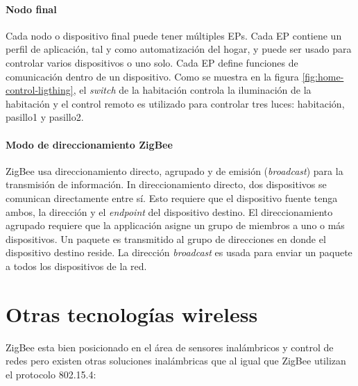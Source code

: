 \documentclass[10pt,journal,compsoc]{IEEEtran}
\begin{document}
\paragraph{Nodo final} Cada nodo o dispositivo final puede tener múltiples EPs. Cada EP contiene un perfil de aplicación, tal y como automatización del hogar, y puede ser usado para controlar varios dispositivos o uno solo. Cada EP define funciones de comunicación dentro de un dispositivo. Como se muestra en la figura \ref{fig:home-control-ligthing}, el \emph{switch} de la habitación controla la iluminación de la habitación y el control remoto es utilizado para controlar tres luces: habitación, pasillo1 y pasillo2.

\paragraph{Modo de direccionamiento ZigBee}
ZigBee usa direccionamiento directo, agrupado y de emisión (\emph{broadcast}) para la transmisión de información. In direccionamiento directo, dos dispositivos se comunican directamente entre sí. Esto requiere que el dispositivo fuente tenga ambos, la dirección y el \emph{endpoint} del dispositivo destino. El direccionamiento agrupado requiere que la applicación asigne un grupo de miembros a uno o más dispositivos. Un paquete es transmitido al grupo de direcciones en donde el dispositivo destino reside. La dirección \emph{broadcast} es usada para enviar un paquete a todos los dispositivos de la red. 


%
%

\section{Otras tecnologías wireless}
ZigBee esta bien posicionado en el área de sensores inalámbricos y control de redes pero existen otras soluciones inalámbricas que al igual que ZigBee utilizan el protocolo 802.15.4:
\end{document}
